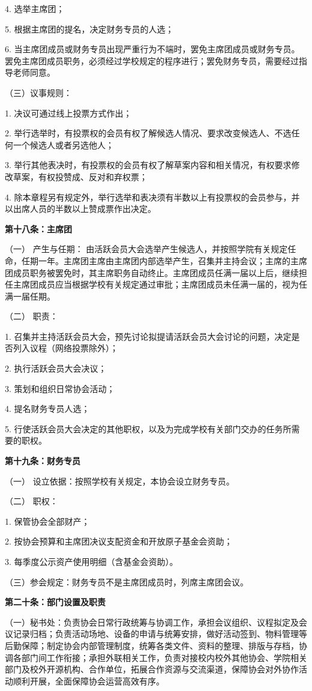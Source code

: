 \documentclass{mjsart}
\begin{document}
4. 选举主席团；

5. 根据主席团的提名，决定财务专员的人选；

6. 当主席团成员或财务专员出现严重行为不端时，罢免主席团成员或财务专员。罢免主席团成员职务，必须经过学校规定的程序进行；罢免财务专员，需要经过指导老师同意。

（三）议事规则：

1. 决议可通过线上投票方式作出；

2. 举行选举时，有投票权的会员有权了解候选人情况、要求改变候选人、不选任何一个候选人或者另选他人；

3. 举行其他表决时，有投票权的会员有权了解草案内容和相关情况，有权要求修改草案，有权投赞成、反对和弃权票；

4. 除本章程另有规定外，举行选举和表决须有半数以上有投票权的会员参与，并以出席人员的半数以上赞成票作出决定。

\textbf{第十八条：主席团}

（一） 产生与任期： 由活跃会员大会选举产生候选人，并按照学院有关规定任命，任期一年。主席团主席由主席团内部选举产生，召集并主持会议；主席的主席团成员职务被罢免时，其主席职务自动终止。主席团成员任满一届以上后，继续担任主席团成员应当根据学校有关规定通过审批；主席团成员未任满一届的，视为任满一届任期。

（二） 职责：

1. 召集并主持活跃会员大会，预先讨论拟提请活跃会员大会讨论的问题，决定是否列入议程（网络投票除外）；

2. 执行活跃会员大会决议；

3. 策划和组织日常协会活动；

4. 提名财务专员人选；

5. 行使活跃会员大会决定的其他职权，以及为完成学校有关部门交办的任务所需要的职权。

\textbf{第十九条：财务专员}

（一） 设立依据：按照学校有关规定，本协会设立财务专员。

（二） 职权：

1. 保管协会全部财产；

2. 按协会预算和主席团决议支配资金和开放原子基金会资助；

3. 每季度公示资产使用明细（含基金会资助）。

（三）参会规定：财务专员不是主席团成员时，列席主席团会议。

\textbf{第二十条：部门设置及职责}

（一）秘书处：负责协会日常行政统筹与协调工作，承担会议组织、议程拟定及会议记录归档；负责活动场地、设备的申请与统筹安排，做好活动签到、物料管理等后勤保障；制定协会内部管理制度，统筹各类文件、资料的整理、排版与存档，协调各部门间工作衔接；承担外联相关工作，负责对接校内校外其他协会、学院相关部门及校外开源机构、合作单位，拓展合作资源与交流渠道，保障协会对外协作活动顺利开展，全面保障协会运营高效有序。
\end{document}
